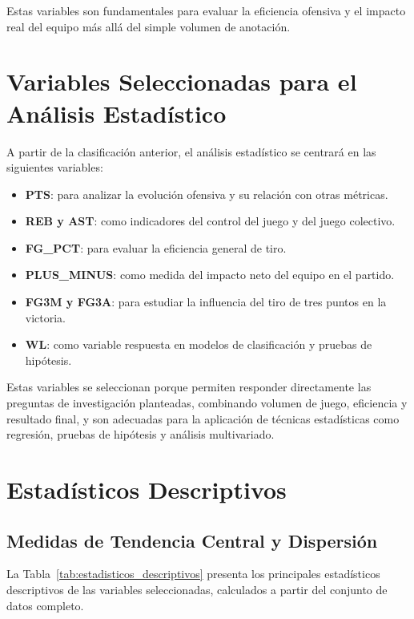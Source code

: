 \documentclass[12pt]{article}
\begin{document}
Estas variables son fundamentales para evaluar la eficiencia ofensiva y el impacto real
del equipo más allá del simple volumen de anotación.

\section{Variables Seleccionadas para el Análisis Estadístico}

A partir de la clasificación anterior, el análisis estadístico se centrará en las siguientes
variables:

\begin{itemize}
    \item \textbf{PTS}: para analizar la evolución ofensiva y su relación con otras métricas.
    \item \textbf{REB y AST}: como indicadores del control del juego y del juego colectivo.
    \item \textbf{FG\_PCT}: para evaluar la eficiencia general de tiro.
    \item \textbf{PLUS\_MINUS}: como medida del impacto neto del equipo en el partido.
    \item \textbf{FG3M y FG3A}: para estudiar la influencia del tiro de tres puntos en la victoria.
    \item \textbf{WL}: como variable respuesta en modelos de clasificación y pruebas de hipótesis.
\end{itemize}

Estas variables se seleccionan porque permiten responder directamente las preguntas
de investigación planteadas, combinando volumen de juego, eficiencia y resultado final,
y son adecuadas para la aplicación de técnicas estadísticas como regresión, pruebas de
hipótesis y análisis multivariado.

\section{Estadísticos Descriptivos}

\subsection{Medidas de Tendencia Central y Dispersión}

La Tabla~\ref{tab:estadisticos_descriptivos} presenta los principales estadísticos descriptivos
de las variables seleccionadas, calculados a partir del conjunto de datos completo.
\end{document}
